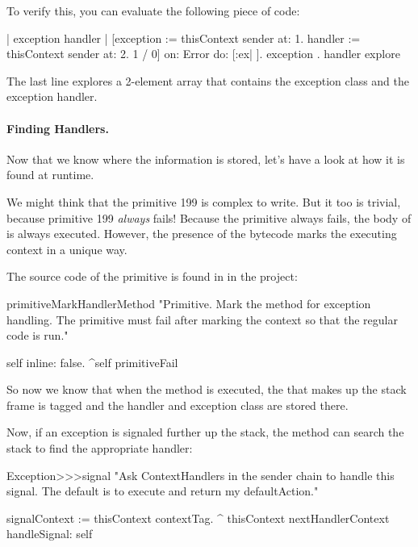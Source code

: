 \documentclass[a4paper,10pt,twoside]{book}
\begin{document}
To verify this, you can evaluate the following piece of code:

\begin{code}{}
| exception handler | 
[exception := thisContext sender at: 1. 
 handler := thisContext sender at: 2. 
 1 / 0] 
on: Error 
do: [:ex| ]. 
{ exception . handler } explore
\end{code}

The last line explores a 2-element array that contains the exception class and the exception handler. 

\paragraph{Finding Handlers.}
Now that we know where the information is stored, let's have a look at how it is found at runtime. 

We might think that the primitive 199 is complex to write. 
But it too is trivial, because primitive 199 \emph{always} fails!
Because the primitive always fails, the \st{} body of  is always executed.
However, the presence of the  bytecode marks the executing context in a unique way. 

The source code of the primitive is found in  in the  \sqsrc project: 

\begin{code}{}
primitiveMarkHandlerMethod
     "Primitive. Mark the method for exception handling. The primitive must fail after
     marking the context so that the regular code is run."
     
     self inline: false.
    ^self primitiveFail
\end{code}
So now we know that when the method  is executed, the  that makes up the stack frame is tagged and the handler and exception class 
are stored there. 

Now, if an exception is signaled further up the stack, the method  can search the stack to find the appropriate handler:

\begin{code}{}
Exception>>>signal
	"Ask ContextHandlers in the sender chain to handle this signal.
	The default is to execute and return my defaultAction."

	signalContext := thisContext contextTag.
	^ thisContext nextHandlerContext handleSignal: self
\end{code}
\end{document}
